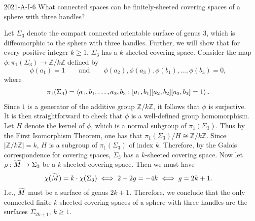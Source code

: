 \documentclass{article}
\begin{document}
	\begin{prb}{2021-A-I-6}
		What connected spaces can be finitely-sheeted covering spaces of a sphere with three handles? \label{prb:2021-A-I-6}
	\end{prb}
	Let $\Sigma_{3}$ denote the compact connected orientable surface of genus 3, which is diffeomorphic to the sphere with three handles. Further, we will show that for every positive integer $k \geq 1$, $\Sigma_{3}$ has a $k$-sheeted covering space. Consider the map $\phi: \pi_{1}(\Sigma_{3}) \to \mathbb{Z}/k\mathbb{Z}$ defined by 
	\begin{equation*}
		\phi(a_{1}) = 1 \qquad \text{and} \qquad \phi(a_{2}), \phi(a_{3}), \phi(b_{1}), \ldots, \phi(b_{3}) = 0, 
	\end{equation*}
	where 
	\begin{equation*}
		\pi_{1}(\Sigma_{3}) = \braket{a_{1}, b_{1}, \ldots, a_{3}, b_{3}: [a_{1},b_{1}][a_{2},b_{2}][a_{3},b_{3}] = 1}. 
	\end{equation*}
	Since $1$ is a generator of the additive group $\mathbb{Z}/k\mathbb{Z}$, it follows that $\phi$ is surjective. It is then straightforward to check that $\phi$ is a well-defined group homomorphism. Let $H$ denote the kernel of $\phi$, which is a normal subgroup of $\pi_{1}(\Sigma_{3})$. Thus by the First Isomorphism Theorem, one has that $\pi_{1}(\Sigma_{3})/H \cong \mathbb{Z}/k\mathbb{Z}$. Since $|\mathbb{Z}/k\mathbb{Z}| = k$, $H$ is a subgroup of $\pi_{1}(\Sigma_{3})$ of index $k$. Therefore, by the Galois correspondence for covering spaces, $\Sigma_{3}$ has a $k$-sheeted covering space. Now let $\rho: \widetilde{M} \to \Sigma_{3}$ be a $k$-sheeted covering space. Then we must have 
	\begin{equation*}
		\chi(\widetilde{M}) = k \cdot \chi(\Sigma_{3}) \iff 2 - 2g = -4k \iff g = 2k + 1. 
	\end{equation*}
	I.e., $\widetilde{M}$ must be a surface of genus $2k + 1$. Therefore, we conclude that the only connected finite $k$-sheeted covering spaces of a sphere with three handles are the surfaces $\Sigma_{2k + 1}$, $k \geq 1$. 
	
\end{document}
